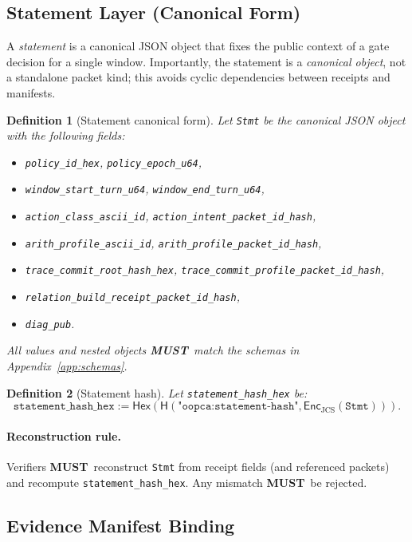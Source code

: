 \documentclass[11pt]{article}
\newcommand{\MUST}{\textbf{MUST}}
\newcommand{\Hash}{\mathsf{H}}
\newcommand{\Enc}{\mathsf{Enc}}
\newcommand{\Hex}{\mathsf{Hex}}
\newtheorem{definition}{Definition}
\begin{document}
\subsection{Statement Layer (Canonical Form)}\label{sec:statement}

A \emph{statement} is a canonical JSON object that fixes the public context of a gate decision for a single window. Importantly, the statement is a \emph{canonical object}, not a standalone packet kind; this avoids cyclic dependencies between receipts and manifests.

\begin{definition}[Statement canonical form]
Let \texttt{Stmt} be the canonical JSON object with the following fields:
\begin{itemize}[leftmargin=1.2em]
  \item \texttt{policy\_id\_hex}, \texttt{policy\_epoch\_u64},
  \item \texttt{window\_start\_turn\_u64}, \texttt{window\_end\_turn\_u64},
  \item \texttt{action\_class\_ascii\_id}, \texttt{action\_intent\_packet\_id\_hash},
  \item \texttt{arith\_profile\_ascii\_id}, \texttt{arith\_profile\_packet\_id\_hash},
  \item \texttt{trace\_commit\_root\_hash\_hex}, \texttt{trace\_commit\_profile\_packet\_id\_hash},
  \item \texttt{relation\_build\_receipt\_packet\_id\_hash},
  \item \texttt{diag\_pub}.
\end{itemize}
All values and nested objects \MUST\ match the schemas in Appendix~\ref{app:schemas}.
\end{definition}

\begin{definition}[Statement hash]
Let \texttt{statement\_hash\_hex} be:
\[
\texttt{statement\_hash\_hex} := \Hex(\Hash(\texttt{"oopca:statement-hash"}, \Enc_{\text{JCS}}(\texttt{Stmt}))).
\]
\end{definition}

\paragraph{Reconstruction rule.}
Verifiers \MUST\ reconstruct \texttt{Stmt} from receipt fields (and referenced packets) and recompute \texttt{statement\_hash\_hex}. Any mismatch \MUST\ be rejected.

\subsection{Evidence Manifest Binding}
\end{document}
